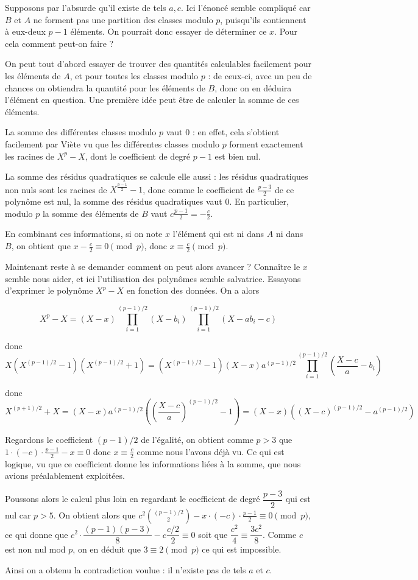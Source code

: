 \begin{sol}
Supposons par l'absurde qu'il existe de tels $a,c$. Ici l'énoncé semble compliqué car $B$ et $A$ ne forment pas une partition des classes modulo $p$, puisqu'ils contiennent à eux-deux $p-1$ éléments. On pourrait donc essayer de déterminer ce $x$. Pour cela comment peut-on faire ?

On peut tout d'abord essayer de trouver des quantités calculables facilement pour les éléments de $A$, et pour toutes les classes modulo $p$ : de ceux-ci, avec un peu de chances on obtiendra la quantité pour les éléments de $B$, donc on en déduira l'élément en question. Une première idée peut être de calculer la somme de ces éléments.

La somme des différentes classes modulo $p$ vaut $0$ : en effet, cela s'obtient facilement par Viète vu que les différentes classes modulo $p$ forment exactement les racines de $X^p-X$, dont le coefficient de degré $p-1$ est bien nul.

La somme des résidus quadratiques se calcule elle aussi : les résidus quadratiques non nuls sont les racines de $X^{\frac{p-1}{2}}-1$, donc comme le coefficient de $\frac{p-3}{2}$ de ce polynôme est nul, la somme des résidus quadratiques vaut $0$. En particulier, modulo $p$ la somme des éléments de $B$ vaut $c\frac{p-1}{2}=-\frac{c}{2}$.

En combinant ces informations, si on note $x$ l'élément qui est ni dans $A$ ni dans $B$, on obtient que $x-\frac{c}{2}\equiv 0 \pmod{p}$, donc $x\equiv \frac{c}{2}\pmod{p}$.

Maintenant reste à se demander comment on peut alors avancer ? Connaître le $x$ semble nous aider, et ici l'utilisation des polynômes semble salvatrice. Essayons d'exprimer le polynôme $X^p-X$ en fonction des données. On a alors 

$$X^p-X=(X-x)\prod \limits_{i=1}^{(p-1)/2} (X-b_i)\prod \limits_{i=1}^{(p-1)/2} (X - ab_i-c)$$

donc $$X(X^{(p-1)/2}-1)(X^{(p-1)/2}+1)=(X^{(p-1)/2}-1)(X-x)a^{(p-1)/2}\prod \limits_{i=1}^{(p-1)/2} (\frac{X-c}a-b_i)$$

donc $$X^{(p+1)/2}+X=(X-x)a^{(p-1)/2} \left(\left(\frac{X-c}a\right)^{(p-1)/2}-1\right)=(X-x)((X-c)^{(p-1)/2}-a^{(p-1)/2})$$

Regardons le coefficient $(p-1)/2$ de l'égalité, on obtient comme $p>3$ que $1\cdot (-c) \cdot \frac{p-1}{2}-x\equiv 0$ donc $x\equiv \frac{c}{2}$ comme nous l'avons déjà vu. Ce qui est logique, vu que ce coefficient donne les informations liées à la somme, que nous avions préalablement exploitées.

Poussons alors le calcul plus loin en regardant le coefficient de degré $\dfrac{p-3}{2}$ qui est nul car $p>5$. On obtient alors que $c^2\binom{(p-1)/2}{2}-x\cdot (-c)\cdot \frac{p-1}{2}\equiv 0 \pmod{p}$, ce qui donne que $c^2\cdot \dfrac{(p-1)(p-3)}{8}-c\dfrac{c/2}{2}\equiv 0$ soit que $\dfrac{c^2}{4}\equiv \dfrac{3c^2}{8}$. Comme $c$ est non nul mod $p$, on en déduit que $3\equiv 2 \pmod{p}$ ce qui est impossible.

Ainsi on a obtenu la contradiction voulue : il n'existe pas de tels $a$ et $c$.
\end{sol}


